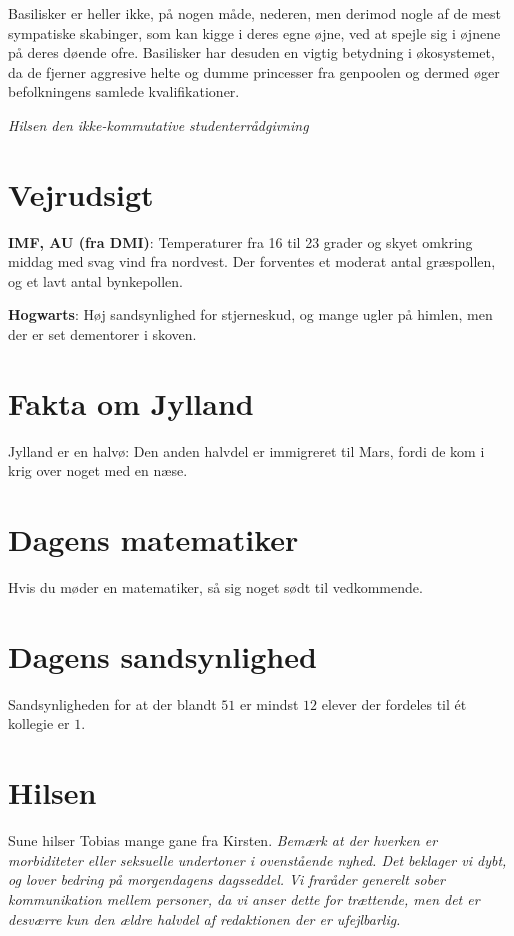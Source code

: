 \begin{minipage}[b]{0.95\linewidth}
\begin{minipage}[t]{0.47\textwidth}
Basilisker er heller ikke, på nogen måde, nederen, men derimod nogle af de mest sympatiske skabinger, som kan kigge i deres egne øjne, ved at spejle sig i øjnene på deres døende ofre. Basilisker har desuden en vigtig betydning i økosystemet, da de fjerner aggresive helte og dumme princesser fra genpoolen og dermed øger befolkningens samlede kvalifikationer.

{\flushright\emph{Hilsen den ikke-kommutative studenterrådgivning}}

\end{minipage}%
\hfill\begin{minipage}[t]{0.47\textwidth}
\vspace{2mm}
\section*{Vejrudsigt}
\textbf{IMF, AU (fra DMI)}: Temperaturer fra 16 til 23 grader og skyet omkring middag med svag vind fra nordvest. Der forventes et moderat antal græspollen, og et lavt antal bynkepollen.

\textbf{Hogwarts}: Høj sandsynlighed for stjerneskud, og mange ugler på himlen, men der er set dementorer i skoven.

\section*{Fakta om Jylland}
Jylland er en halvø: Den anden halvdel er immigreret til Mars, fordi de kom i krig over noget med en næse.

\section*{Dagens matematiker}
Hvis du møder en matematiker, så sig noget sødt til vedkommende.

\section*{Dagens sandsynlighed}
Sandsynligheden for at der blandt $51$ er mindst $12$ elever der fordeles til ét kollegie er $1$. 

\section*{Hilsen}
Sune hilser Tobias mange gane fra Kirsten.
\emph{Bemærk at der hverken er morbiditeter eller seksuelle undertoner i ovenstående nyhed. Det beklager vi dybt, og lover bedring på morgendagens dagsseddel. Vi fraråder generelt sober kommunikation mellem personer, da vi anser dette for trættende, men det er desværre kun den ældre halvdel af redaktionen der er ufejlbarlig.}
\end{minipage}


\end{minipage}
